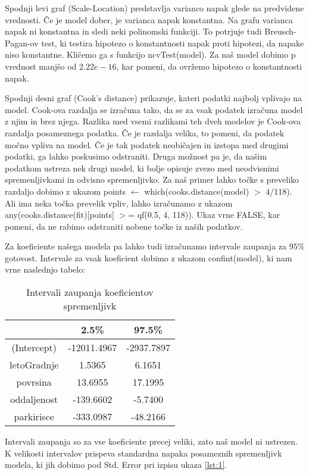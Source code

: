 \documentclass[a4paper, 12pt]{article}
\begin{document}
Spodnji levi graf (Scale-Location) predstavlja varianco napak glede na
predvidene vrednosti. Če je model dober, je varianca napak konstantna.
Na grafu varianca napak ni konstantna in sledi neki polinomski funkciji.
To potrjuje tudi Breusch-Pagan-ov test, ki testira hipotezo o konstantnosti
napak proti hipotezi, da napake niso konstantne. Kličemo ga s funkcijo
{\sf ncvTest(model)}. Za naš model dobimo p vrednost manjšo od $ 2.22e-16 $,
kar pomeni, da ovržemo hipotezo o konstantnosti napak.

Spodnji desni graf (Cook's distance) prikazuje, kateri podatki najbolj
vplivajo na model. Cook-ova razdalja se izračuna tako, da se za vsak podatek
izračuna model z njim in brez njega. Razlika med vsemi razlikami teh dveh
modelov je Cook-ova razdalja posameznega podatka. Če je razdalja velika,
to pomeni, da podatek močno vpliva na model. Če je tak podatek neobičajen in
izstopa med drugimi podatki, ga lahko poskusimo odstraniti. Druga možnost pa
je, da našim podatkom ustreza nek drugi model, ki bolje opisuje zvezo med
neodvisnimi spremenljivkami in odvisno spremenljivko. Za naš primer lahko točke
s preveliko razdaljo dobimo z ukazom {\sf points $\leftarrow$ which(cooks.distance(model) $ > $ 4/118)}.
Ali ima neka točka prevelik vpliv, lahko izračunamo z ukazom
{\sf any(cooks.distance(fit)[points] $ > $= qf(0.5, 4, 118))}. Ukaz vrne FALSE,
kar pomeni, da ne rabimo odstraniti nobene točke iz naših podatkov.

Za koeficiente našega modela pa lahko tudi izračunamo intervale zaupanja za
$ 95\% $ gotovost. Intervale za vsak koeficient dobimo z ukazom {\sf confint(model)}, ki
nam vrne naslednjo tabelo:
\begin{table}[H]
\begin{center}
\caption{Intervali zaupanja koeficientov spremenljivk}
\begin{tabular}{ c|cc }
	& 2.5\% & 97.5\% \\
	\hline
	(Intercept) & -12011.4967 & -2937.7897 \\
	letoGradnje & 1.5365 & 6.1651 \\
	povrsina & 13.6955 & 17.1995 \\
	oddaljenost & -139.6602 & -5.7400 \\
	parkirisce & -333.0987 & -48.2166 \\
\end{tabular}
\end{center}
\end{table}
Intervali zaupanja so za vse koeficiente precej veliki, zato naš model ni
ustrezen. K velikosti intervalov prispeva standardna napaka posameznih
spremenljivk modela, ki jih dobimo pod {\sf Std. Error} pri izpisu ukaza
\ref{lst:1}.
\end{document}
